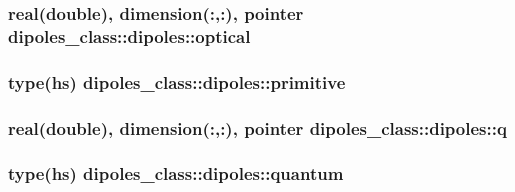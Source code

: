 \hypertarget{structdipoles__class_1_1dipoles_a7a0b0cffbbb4e48c4bced86e3684ac14}{
\subsubsection[{optical}]{\setlength{\rightskip}{0pt plus 5cm}real(double), dimension(\-:,\-:), pointer dipoles\-\_\-class\-::dipoles\-::optical\hspace{0.3cm}{\ttfamily [private]}}}\label{structdipoles__class_1_1dipoles_a7a0b0cffbbb4e48c4bced86e3684ac14}
\hypertarget{structdipoles__class_1_1dipoles_a56b509ba86b8121570bd7a051cc77fd9}{
\subsubsection[{primitive}]{\setlength{\rightskip}{0pt plus 5cm}type({\bf hs}) dipoles\-\_\-class\-::dipoles\-::primitive\hspace{0.3cm}{\ttfamily [private]}}}\label{structdipoles__class_1_1dipoles_a56b509ba86b8121570bd7a051cc77fd9}
\hypertarget{structdipoles__class_1_1dipoles_ab97f9dcc84c8fafe029986f103d99630}{
\subsubsection[{q}]{\setlength{\rightskip}{0pt plus 5cm}real(double), dimension(\-:,\-:), pointer dipoles\-\_\-class\-::dipoles\-::q\hspace{0.3cm}{\ttfamily [private]}}}\label{structdipoles__class_1_1dipoles_ab97f9dcc84c8fafe029986f103d99630}
\hypertarget{structdipoles__class_1_1dipoles_a7b6d2a8feca2c1198896fb10627d029b}{
\subsubsection[{quantum}]{\setlength{\rightskip}{0pt plus 5cm}type({\bf hs}) dipoles\-\_\-class\-::dipoles\-::quantum\hspace{0.3cm}{\ttfamily [private]}}}\label{structdipoles__class_1_1dipoles_a7b6d2a8feca2c1198896fb10627d029b}
